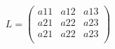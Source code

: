 
\begin{equation}       %
L=
\left(                 %
  \begin{array}{ccc}   %
    a11 & a12 & a13\\  %
    a21 & a22 & a23\\  %
    a21 & a22 & a23\\
  \end{array}
\right)                 %
\end{equation}